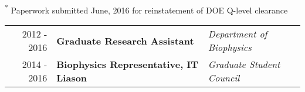 \begin{center}
\begin{minipage}{\textwidth}
\begin{itemize}
	\end{itemize}
\end{minipage}
    \end{center}

\begin{minipage}{\textwidth}
\begin{center}
\footnotesize \textsuperscript{*} Paperwork submitted June, 2016 for reinstatement of DOE Q-level clearance
\end{center}
\end{minipage}


\begin{minipage}{\textwidth}
	\begin{tabular}{r|ll}
		2012 - 2016 & \textbf{Graduate Research Assistant} & \textit{Department of Biophysics}  \\
		2014 - 2016 & \textbf{Biophysics Representative, IT Liason} & \textit{Graduate Student Council}  \\
	\end{tabular}
\end{minipage}

